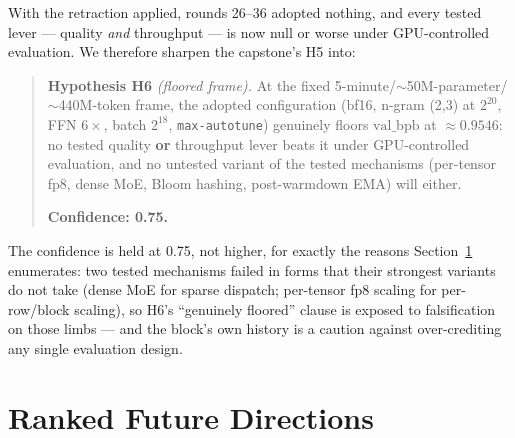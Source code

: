 \documentclass{article}
\newcommand{\valbpb}{\mathrm{val\_bpb}}
\begin{document}
With the retraction applied, rounds 26--36 adopted nothing, and every tested lever --- quality \emph{and} throughput --- is now null or worse under GPU-controlled evaluation. We therefore sharpen the capstone's H5 into:

\begin{quote}
\textbf{Hypothesis H6} \emph{(floored frame).} At the fixed 5-minute/$\sim$50M-parameter/$\sim$440M-token frame, the adopted configuration (bf16, n-gram (2,3) at $2^{20}$, FFN $6\times$, batch $2^{18}$, \texttt{max-autotune}) genuinely floors $\valbpb$ at $\approx 0.9546$: no tested quality \textbf{or} throughput lever beats it under GPU-controlled evaluation, and no untested variant of the tested mechanisms (per-tensor fp8, dense MoE, Bloom hashing, post-warmdown EMA) will either.

\textbf{Confidence: 0.75.}
\end{quote}

The confidence is held at 0.75, not higher, for exactly the reasons Section~\ref{sec:future} enumerates: two tested mechanisms failed in forms that their strongest variants do not take (dense MoE for sparse dispatch; per-tensor fp8 scaling for per-row/block scaling), so H6's ``genuinely floored'' clause is exposed to falsification on those limbs --- and the block's own history is a caution against over-crediting any single evaluation design.

\section{Ranked Future Directions}
\label{sec:future}
\end{document}
